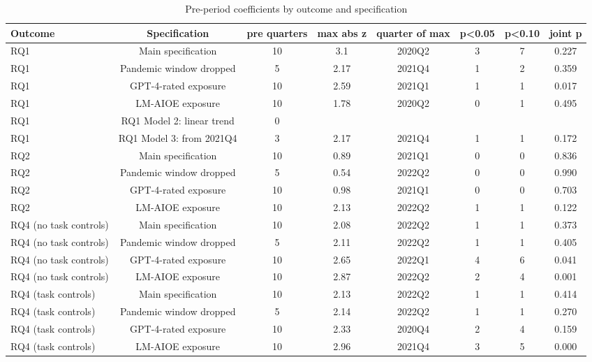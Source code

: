 \begin{table}[htbp]\centering
\caption{Pre-period coefficients by outcome and specification}
\begin{tabular}{lccccccc}
\toprule
Outcome & Specification & pre quarters & max abs z & quarter of max & p<0.05 & p<0.10 & joint p \\
\midrule
RQ1 & Main specification & 10 & 3.1 & 2020Q2 & 3 & 7 & 0.227 \\
RQ1 & Pandemic window dropped & 5 & 2.17 & 2021Q4 & 1 & 2 & 0.359 \\
RQ1 & GPT-4-rated exposure & 10 & 2.59 & 2021Q1 & 1 & 1 & 0.017 \\
RQ1 & LM-AIOE exposure & 10 & 1.78 & 2020Q2 & 0 & 1 & 0.495 \\
RQ1 & RQ1 Model 2: linear trend & 0 &  &  &  &  &  \\
RQ1 & RQ1 Model 3: from 2021Q4 & 3 & 2.17 & 2021Q4 & 1 & 1 & 0.172 \\
RQ2 & Main specification & 10 & 0.89 & 2021Q1 & 0 & 0 & 0.836 \\
RQ2 & Pandemic window dropped & 5 & 0.54 & 2022Q2 & 0 & 0 & 0.990 \\
RQ2 & GPT-4-rated exposure & 10 & 0.98 & 2021Q1 & 0 & 0 & 0.703 \\
RQ2 & LM-AIOE exposure & 10 & 2.13 & 2022Q2 & 1 & 1 & 0.122 \\
RQ4 (no task controls) & Main specification & 10 & 2.08 & 2022Q2 & 1 & 1 & 0.373 \\
RQ4 (no task controls) & Pandemic window dropped & 5 & 2.11 & 2022Q2 & 1 & 1 & 0.405 \\
RQ4 (no task controls) & GPT-4-rated exposure & 10 & 2.65 & 2022Q1 & 4 & 6 & 0.041 \\
RQ4 (no task controls) & LM-AIOE exposure & 10 & 2.87 & 2022Q2 & 2 & 4 & 0.001 \\
RQ4 (task controls) & Main specification & 10 & 2.13 & 2022Q2 & 1 & 1 & 0.414 \\
RQ4 (task controls) & Pandemic window dropped & 5 & 2.14 & 2022Q2 & 1 & 1 & 0.270 \\
RQ4 (task controls) & GPT-4-rated exposure & 10 & 2.33 & 2020Q4 & 2 & 4 & 0.159 \\
RQ4 (task controls) & LM-AIOE exposure & 10 & 2.96 & 2021Q4 & 3 & 5 & 0.000 \\
\bottomrule
\end{tabular}
\par\vspace{2pt}{\footnotesize Counts of individually significant pre-period coefficients, the largest $|$estimate/SE$|$, and the p-value of the joint Wald test that all pre-period coefficients are zero (clustered covariance; blank for runs made before step 07 saved it).}
\end{table}
